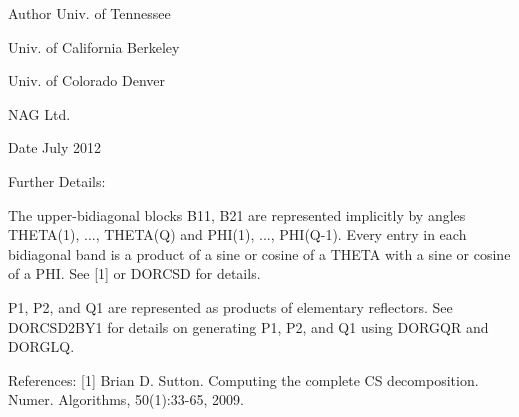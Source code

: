 \begin{DoxyAuthor}{Author}
Univ. of Tennessee 

Univ. of California Berkeley 

Univ. of Colorado Denver 

N\+A\+G Ltd. 
\end{DoxyAuthor}
\begin{DoxyDate}{Date}
July 2012 
\end{DoxyDate}
\begin{DoxyParagraph}{Further Details\+: }
\begin{DoxyVerb}  The upper-bidiagonal blocks B11, B21 are represented implicitly by
  angles THETA(1), ..., THETA(Q) and PHI(1), ..., PHI(Q-1). Every entry
  in each bidiagonal band is a product of a sine or cosine of a THETA
  with a sine or cosine of a PHI. See [1] or DORCSD for details.

  P1, P2, and Q1 are represented as products of elementary reflectors.
  See DORCSD2BY1 for details on generating P1, P2, and Q1 using DORGQR
  and DORGLQ.\end{DoxyVerb}
 
\end{DoxyParagraph}
\begin{DoxyParagraph}{References\+: }
\mbox{[}1\mbox{]} Brian D. Sutton. Computing the complete C\+S decomposition. Numer. Algorithms, 50(1)\+:33-\/65, 2009. 
\end{DoxyParagraph}
